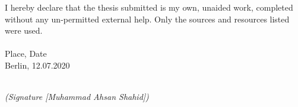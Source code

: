 \newpage

\thispagestyle{empty}

\begin{large}

\vspace*{6cm}

\noindent
I hereby declare that the thesis submitted is my own, unaided work, completed
without any un-permitted external help. Only the sources and resources listed were
used.
\\
\\

\noindent
Place, Date
\\

\noindent
Berlin, 12.07.2020

\vspace{3cm}

\hspace*{9cm}%
\dotfill\\
\hspace*{8.5cm}%
\textit{(Signature [Muhammad Ahsan Shahid])}

\end{large}
